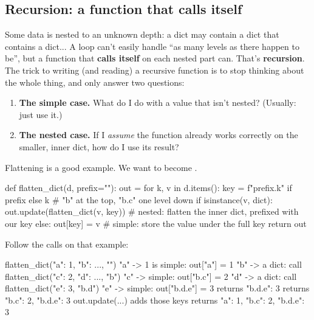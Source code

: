 \documentclass[10pt,a4paper]{article}
\begin{document}
\subsection{Recursion: a function that calls itself}
Some data is nested to an unknown depth: a dict may contain a dict that contains a dict... A loop can’t easily handle “as many levels as there happen to be”, but a function that \textbf{calls itself} on each nested part can. That’s \textbf{recursion}.
The trick to writing (and reading) a recursive function is to stop thinking about the whole thing, and only answer two questions:
\begin{enumerate}
\item \textbf{The simple case.} What do I do with a value that isn’t nested? (Usually: just use it.)
\item \textbf{The nested case.} If I \emph{assume} the function already works correctly on the smaller, inner dict, how do I use its result?
\end{enumerate}
Flattening is a good example. We want  to become .
\begin{pycode}
def flatten_dict(d, prefix=""):
    out = {}
    for k, v in d.items():
        key = f"{prefix}.{k}" if prefix else k     # "b" at the top, "b.c" one level down
        if isinstance(v, dict):
            out.update(flatten_dict(v, key))      # nested: flatten the inner dict, prefixed with our key
        else:
            out[key] = v                          # simple: store the value under the full key
    return out
\end{pycode}
Follow the calls on that example:
\begin{txtcode}
flatten_dict({"a": 1, "b": {...}}, "")
  "a" -> 1 is simple: out["a"] = 1
  "b" -> a dict: call flatten_dict({"c": 2, "d": {...}}, "b")
          "c" -> simple: out["b.c"] = 2
          "d" -> a dict: call flatten_dict({"e": 3}, "b.d")
                  "e" -> simple: out["b.d.e"] = 3
                  returns {"b.d.e": 3}
          returns {"b.c": 2, "b.d.e": 3}
  out.update(...) adds those keys
  returns {"a": 1, "b.c": 2, "b.d.e": 3}
\end{txtcode}
\end{document}
